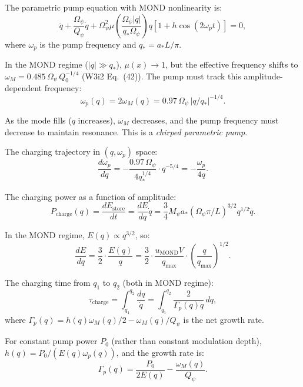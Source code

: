 \documentclass[11pt]{article}
\theoremstyle{definition}
\theoremstyle{remark}
\newcommand{\Qpsi}{Q_\psi}
\newcommand{\Mpsi}{M_\psi}
\newcommand{\Opsi}{\Omega_\psi}
\newcommand{\astar}{a_*}
\begin{document}
The parametric pump equation with MOND nonlinearity is:
\begin{equation}
\ddot{q} + \frac{\Opsi}{\Qpsi}\dot{q}
+ \Opsi^2 \mu\!\left(\frac{\Opsi |q|}{q_* \Opsi}\right) q
\left[1 + h\cos(2\omega_p t)\right] = 0,
\end{equation}
where $\omega_p$ is the pump frequency and $q_* = \astar L / \pi$.

In the MOND regime ($|q| \gg q_*$), $\mu(x) \to 1$, but the
effective frequency shifts to $\omega_M = 0.485\,\Opsi\,Q_0^{-1/4}$
(W3i2 Eq.~(42)). The pump must track this amplitude-dependent
frequency:
\begin{equation}
\omega_p(q) = 2\omega_M(q) = 0.97\,\Opsi\,|q/q_*|^{-1/4}.
\end{equation}

As the mode fills ($q$ increases), $\omega_M$ decreases, and the
pump frequency must decrease to maintain resonance. This is a
\emph{chirped parametric pump}.

The charging trajectory in $(q, \omega_p)$ space:
\begin{equation}
\frac{d\omega_p}{dq} = -\frac{0.97\,\Opsi}{4 q_*^{1/4}} \cdot q^{-5/4}
= -\frac{\omega_p}{4q}.
\end{equation}

The charging power as a function of amplitude:
\begin{equation}
P_{\mathrm{charge}}(q) = \frac{d E_{\mathrm{store}}}{dt}
= \frac{dE}{dq}\dot{q}
= \frac{3}{4}\Mpsi \astar (\Opsi \pi / L)^{3/2} q^{1/2} \dot{q}.
\end{equation}

In the MOND regime, $E(q) \propto q^{3/2}$, so:
\begin{equation}
\frac{dE}{dq} = \frac{3}{2} \cdot \frac{E(q)}{q}
= \frac{3}{2} \cdot \frac{u_{\mathrm{MOND}} V}{q_{\max}} \cdot \left(\frac{q}{q_{\max}}\right)^{1/2}.
\end{equation}

The charging time from $q_1$ to $q_2$ (both in MOND regime):
\begin{equation}
\tau_{\mathrm{charge}} = \int_{q_1}^{q_2} \frac{dq}{\dot{q}}
= \int_{q_1}^{q_2} \frac{2}{\Gamma_p(q) q}\,dq,
\end{equation}
where $\Gamma_p(q) = h(q)\omega_M(q)/2 - \omega_M(q)/\Qpsi$ is the
net growth rate.

For constant pump power $P_0$ (rather than constant modulation depth),
$h(q) = P_0 / (E(q) \omega_p(q))$, and the growth rate is:
\begin{equation}
\Gamma_p(q) = \frac{P_0}{2 E(q)} - \frac{\omega_M(q)}{\Qpsi}.
\end{equation}
\end{document}
